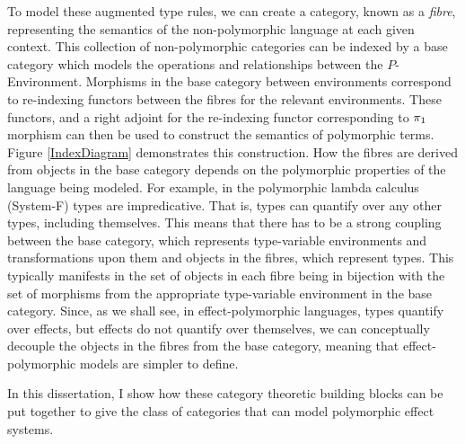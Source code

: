 \documentclass{Report}
\begin{document}
To model these augmented type rules, we can create a category, known as a \textit{fibre}, representing the semantics  of the non-polymorphic language at each given context. This collection of non-polymorphic categories can be indexed by a base category which models the operations and relationships between the $P$-Environment. Morphisms in the base category between environments correspond to re-indexing functors between the fibres for the relevant environments. These functors, and a right adjoint for the re-indexing functor corresponding to $\pi_1$ morphism can then be used to construct the semantics of polymorphic terms. Figure \ref{IndexDiagram} demonstrates this construction. How the fibres are derived from objects in the base category depends on the polymorphic properties of the language being modeled. For example, in the polymorphic lambda calculus (System-F) types are impredicative. That is, types can quantify over any other types, including themselves. This means that there has to be a strong coupling between the base category, which represents type-variable environments and transformations upon them and objects in the fibres, which represent types. This typically manifests in the set of objects  in each fibre being in bijection with the set of morphisms from the appropriate type-variable environment in the base category. Since, as we shall see, in effect-polymorphic languages, types quantify over effects, but effects do not quantify over themselves, we can conceptually decouple the objects in the fibres from the base category, meaning that effect-polymorphic models are simpler to define. 

In this dissertation, I show how these category theoretic building blocks can be put together to give the class of categories that can model polymorphic effect systems.
\end{document}

